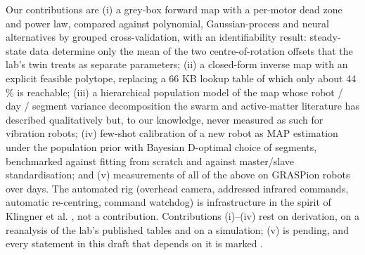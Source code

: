 Our contributions are (i) a grey-box forward map with a per-motor dead
zone and power law, compared against polynomial, Gaussian-process and
neural alternatives by grouped cross-validation, with an identifiability
result: steady-state data determine only the mean of the two
centre-of-rotation offsets that the lab's twin treats as separate
parameters; (ii) a closed-form inverse map with an explicit feasible
polytope, replacing a 66 KB lookup table of which only about 44 \% is
reachable; (iii) a hierarchical population model of the map whose robot
/ day / segment variance decomposition the swarm and active-matter
literature has described qualitatively but, to our knowledge, never
measured as such for vibration robots; (iv) few-shot
calibration of a new robot as MAP estimation under the population prior
with Bayesian D-optimal choice of segments, benchmarked against fitting
from scratch and against master/slave standardisation; and (v)
measurements of all of the above on  GRASPion robots over
 days. The automated rig (overhead camera, addressed infrared commands,
automatic re-centring, command watchdog) is infrastructure in the spirit
of Klingner et al. \cite{klingner2014droplet}, not a contribution.
Contributions (i)--(iv) rest on derivation, on a reanalysis of the lab's
published tables and on a simulation; (v) is pending, and every
statement in this draft that depends on it is marked \hw{\ldots}.
